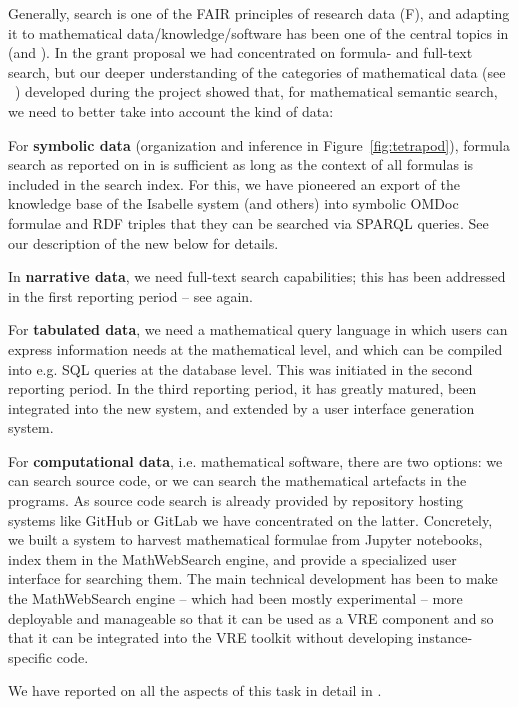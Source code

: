 Generally, search is one of the FAIR principles of research data (F), and adapting it to mathematical data/knowledge/software has been one of the central topics in  (and ). In the grant proposal we had concentrated on formula- and full-text search, but our deeper understanding of the categories of mathematical data (see ~\cite{ODK-D6.10}) developed during the \pn project showed that, for mathematical semantic search, we need to better take into account the kind of data:
\begin{compactitem}
\item For \textbf{symbolic data} (organization and inference in Figure~\ref{fig:tetrapod}), formula search as reported on in \cite{ODK-D6.1} is sufficient as long as the context of all formulas is included in the search index. For this, we have pioneered an export of the knowledge base of the Isabelle system (and others) into symbolic OMDoc formulae and RDF triples that they can be searched via SPARQL queries. See our description of the new  below for details.
\item In \textbf{narrative data}, we need full-text search capabilities; this has been addressed in the first reporting period -- see \cite{ODK-D6.1} again.
\item For \textbf{tabulated data}, we need a mathematical query language in which users can express information needs at the mathematical level, and which can be compiled into e.g. SQL queries at the database level.
  This was initiated in the second reporting period.
   In the third reporting period, it has greatly matured, been integrated into the new \dmh system, and extended by a user interface generation system.
\item For \textbf{computational data}, i.e. mathematical software, there are two options: we can search source code, or we can search the mathematical artefacts in the programs.
  As source code search is already provided by repository hosting systems like GitHub or GitLab we have concentrated on the latter.
  Concretely, we built a system to harvest mathematical formulae from Jupyter notebooks, index them in the MathWebSearch engine, and provide a specialized user interface for searching them.
  The main technical development has been to make the MathWebSearch engine -- which had been mostly experimental -- more deployable and manageable so that it can be used as a VRE component and so that it can be integrated into the \pn VRE toolkit without developing instance-specific code. 
\end{compactitem}
We have reported on all the aspects of this task in detail in \cite{ODK-D6.10}.
\medskip

